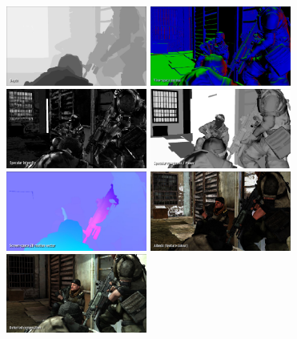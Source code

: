 \begin{figure}[h]
    \centering
    \includegraphics[width=175px]{images/graphics/killzone-2-buffer-depth.jpg}
    \includegraphics[width=175px]{images/graphics/killzone-2-buffer-vsn.jpg}
    \includegraphics[width=175px]{images/graphics/killzone-2-buffer-specular.jpg}
    \includegraphics[width=175px]{images/graphics/killzone-2-buffer-specular-rough.jpg}
    \includegraphics[width=175px]{images/graphics/killzone-2-buffer-ss-motion.jpg}
    \includegraphics[width=175px]{images/graphics/killzone-2-buffer-albedo.jpg}
    \includegraphics[width=175px]{images/graphics/killzone-2-buffer-composed-result.jpg}

\end{figure}
